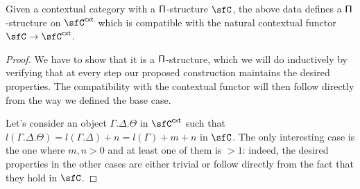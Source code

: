 \begin{prop}
  Given a contextual category with a $\operatorname{\mathsf{\Pi}}$-structure $\sfC$, the above data
  defines a $\operatorname{\mathsf{\Pi}}$-structure on $\sfC^{\cxt}$ which is compatible with the natural
  contextual functor $\sfC\rightarrow\sfC^{\cxt}$.
\end{prop}
\begin{proof}
  We have to
  show that it is a $\operatorname{\mathsf{\Pi}}$-structure, which we will do inductively by verifying
  that at every step our proposed construction maintains the desired properties.
  The compatibility with the contextual functor will then follow directly from
  the way we defined the base case.

  Let's consider an object $\Gamma.\Delta.\Theta$ in $\sfC^{\cxt}$ such that
  $l(\Gamma.\Delta.\Theta)=l(\Gamma.\Delta)+n=l(\Gamma)+m+n$ in $\sfC$. The only
  interesting case is the one where $m,n>0$ and at least one of them is
  $>1$: indeed, the desired properties in the other cases are either
  trivial or follow directly from the fact that they hold in $\sfC$.


\end{proof}
